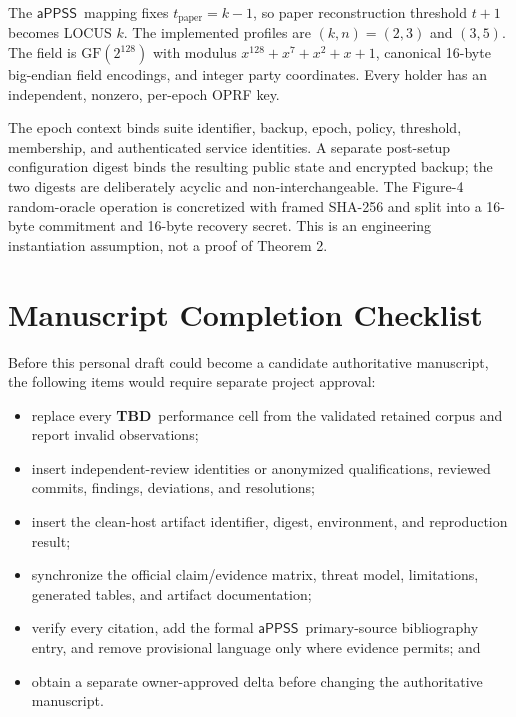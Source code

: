 \documentclass[sigconf,anonymous]{acmart}
\newcommand{\APPSS}{\ensuremath{\mathsf{aPPSS}}}
\newcommand{\TBD}{\textbf{TBD}}
\begin{document}
The \APPSS\ mapping fixes \(t_{\mathrm{paper}}=k-1\), so paper reconstruction
threshold \(t+1\) becomes LOCUS \(k\). The implemented profiles are
\((k,n)=(2,3)\) and \((3,5)\). The field is
\(\mathrm{GF}(2^{128})\) with modulus
\(x^{128}+x^7+x^2+x+1\), canonical 16-byte big-endian field encodings, and
integer party coordinates. Every holder has an independent, nonzero,
per-epoch OPRF key.

The epoch context binds suite identifier, backup, epoch, policy, threshold,
membership, and authenticated service identities. A separate post-setup
configuration digest binds the resulting public state and encrypted backup;
the two digests are deliberately acyclic and non-interchangeable. The
Figure-4 random-oracle operation is concretized with framed SHA-256 and split
into a 16-byte commitment and 16-byte recovery secret. This is an engineering
instantiation assumption, not a proof of Theorem 2.

\section{Manuscript Completion Checklist}

Before this personal draft could become a candidate authoritative manuscript,
the following items would require separate project approval:
\begin{itemize}
  \item replace every \TBD\ performance cell from the validated retained
  corpus and report invalid observations;
  \item insert independent-review identities or anonymized qualifications,
  reviewed commits, findings, deviations, and resolutions;
  \item insert the clean-host artifact identifier, digest, environment, and
  reproduction result;
  \item synchronize the official claim/evidence matrix, threat model,
  limitations, generated tables, and artifact documentation;
  \item verify every citation, add the formal \APPSS\ primary-source
  bibliography entry, and remove provisional language only where evidence
  permits; and
  \item obtain a separate owner-approved delta before changing the
  authoritative manuscript.
\end{itemize}
\end{document}
